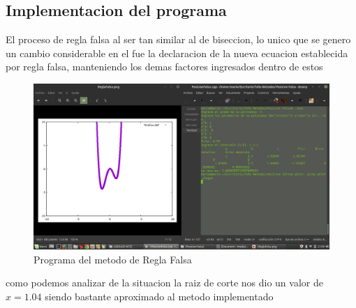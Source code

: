 \documentclass{article}
\begin{document}
\begin{multicols}{2}
\section{Implementacion del programa}
\label{sec:Imp}
El proceso de regla falsa al ser tan similar al de biseccion, lo unico que se genero un cambio considerable en el fue la declaracion de la nueva ecuacion establecida por regla falsa, manteniendo los demas factores ingresados dentro de estos
\begin{figure}[H]
\centering
\includegraphics[scale=.125]{ReglaFalsa.png}
\caption{Programa del metodo de Regla Falsa}
\end{figure}
como podemos analizar de la situacion la raiz de corte nos dio un valor de $x=1.04$ siendo bastante aproximado al metodo implementado

\end{multicols}
\end{document}
